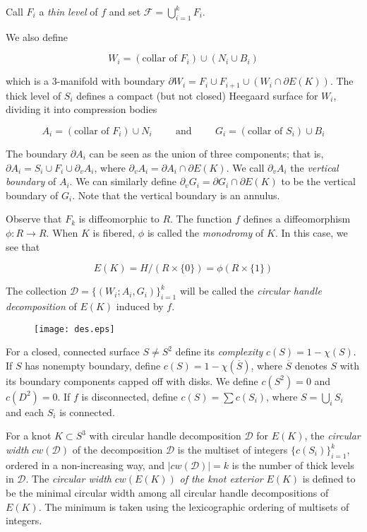 \documentclass[12pt]{amsart}
\begin{document}
Call $F_{i}$ a \emph{thin level} of $f$ and set $\mathcal{F}=\bigcup_{i=1}^{k} F_{i}$. 

We also define

$$
W_{i}=(\text{collar of } F_{i})\cup (N_{i}\cup B_{i})
$$

\noindent which is a $3$-manifold with boundary $\partial W_{i}=F_{i}\cup F_{i+1}\cup (W_{i}\cap\partial E(K))$. The thick level of $S_{i}$ defines a compact (but not closed) Heegaard surface for $W_{i}$, dividing it into compression bodies

$$
A_{i}=(\text{collar of } F_{i})\cup N_{i} \hspace{1cm}\text{and}\hspace{1cm} G_{i}=(\text{collar of } S_{i})\cup B_{i}
$$

The boundary $\partial A_{i}$ can be seen as the union of three components; that is, $\partial A_{i}=S_{i}\cup F_{i}\cup\partial_{v} A_{i}$,	where $\partial_{v} A_{i}=\partial A_{i}\cap\partial E(K)$. We call $\partial_{v} A_{i}$ the \emph{vertical boundary} of $A_{i}$. We can similarly define $\partial_{v} G_{i}=\partial G_{i}\cap\partial E(K)$ to be the vertical boundary of $G_{i}$. Note that the vertical boundary is an annulus.

Observe that $F_{k}$ is diffeomorphic to $R$. The function $f$ defines a diffeomorphism $\phi:R\to R$. When $K$ is fibered, $\phi$ is called the \emph{monodromy} of $K$. In this case, we see that 

$$
E(K)=H/(R\times\{0\})=\phi (R\times\{1\})
$$

The collection $\mathcal{D}=\{(W_{i};A_{i},G_{i})\}_{i=1}^{k}$ will be called the \emph{circular handle decomposition} of $E(K)$ induced by $f$.

\begin{figure}
\begin{center}
\texttt{[image: des.eps]} \end{center}
\caption{}
\label{}
\end{figure}


For a closed, connected surface $S\neq S^{2}$ define its \emph{complexity} $c(S)=1-\chi(S)$. If $S$ has nonempty boundary, define $c(S)=1-\chi(\overline{S})$, where $\overline{S}$ denotes $S$ with its  boundary components capped off with disks. We define $c(S^{2})=0$ and $c(D^{2})=0$. If $f$ is disconnected, define $c(S)=\sum c(S_{i})$, where $S=\bigcup_{i} S_{i}$ and each $S_{i}$ is connected.

For a knot $K\subset S^{3}$ with circular handle decomposition $\mathcal{D}$ for $E(K)$, the \emph{circular width} $cw(\mathcal{D})$ of the decomposition $\mathcal{D}$ is the multiset of integers $\{c(S_{i})\}_{i=1}^{k}$, ordered in a non-increasing way, and $|cw(\mathcal{D})|=k$ is the number of thick levels in $\mathcal{D}$. The \emph{circular width } $cw(E(K))$ \emph{of the knot exterior} $E(K)$ is defined to be the minimal circular width among all circular handle decompositions of $E(K)$. The minimum is taken using the lexicographic ordering of multisets of integers.
\end{document}
